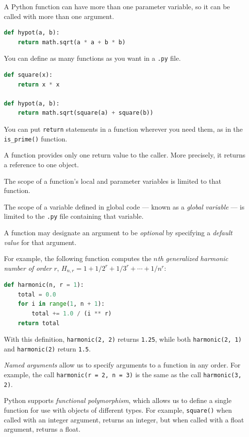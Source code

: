 \documentclass[8pt,a4paper,compress,handout]{beamer}
\begin{document}
\begin{frame}[fragile]
A Python function can have more than one parameter variable, so it can be called with more than one argument. 
\begin{lstlisting}[language=Python]
def hypot(a, b):
    return math.sqrt(a * a + b * b)
\end{lstlisting}

\bigskip

You can define as many functions as you want in a \lstinline{.py} file. 
\begin{lstlisting}[language=Python]
def square(x):
    return x * x

def hypot(a, b):
    return math.sqrt(square(a) + square(b))
\end{lstlisting}

\bigskip

You can put \lstinline{return} statements in a function wherever you need them, as in the \lstinline{is_prime()} function.

\bigskip

A function provides only one return value to the caller. More precisely, it returns a reference to one object.

\bigskip

The scope of a function's local and parameter variables is limited to that function.

\bigskip

The scope of a variable defined in global code --- known as a \emph{global variable} --- is limited to the \lstinline{.py} file containing that variable. 
\end{frame}

\begin{frame}[fragile]
A function may designate an argument to be \emph{optional} by specifying a \emph{default value} for that argument. 

\bigskip

For example, the following function computes the \emph{$n$th generalized harmonic number of order $r$}, $H_{n,r}=1+1/2^r+1/3^r+\cdots+1/n^r$:

\begin{lstlisting}[language=Python]
def harmonic(n, r = 1):
    total = 0.0
    for i in range(1, n + 1):
        total += 1.0 / (i ** r)
    return total
\end{lstlisting}
With this definition, \lstinline{harmonic(2, 2)} returns \lstinline{1.25}, while both \lstinline{harmonic(2, 1)} and \lstinline{harmonic(2)} return \lstinline{1.5}.

\bigskip

\emph{Named arguments} allow us to specify arguments to a function in any order. For example, the call \lstinline{harmonic(r = 2, n = 3)} is the same as the call \lstinline{harmonic(3, 2)}.

\bigskip

Python supports \emph{functional polymorphism}, which allows us to define a single function for use with objects of different types. For example, \lstinline{square()} when called with an integer argument, returns an integer, but when called with a float argument, returns a float.
\end{frame}
\end{document}
